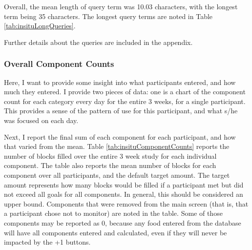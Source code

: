 Overall, the mean length of query term was 10.03 characters, with the longest term being 35 characters. The longest query terms are noted in Table \ref{tab:insituLongQueries}.

Further details about the queries are included in the appendix. 


\subsubsection{Overall Component Counts}
Here, I want to provide some insight into what participants entered, and how much they entered. I provide two pieces of data: one is a chart of the component count for each category every day for the entire 3 weeks, for a single participant. This provides a sense of the pattern of use for this participant, and what s/he was focused on each day. 

Next, I report the final sum of each component for each participant, and how that varied from the mean. Table \ref{tab:insituComponentCounts} reports the number of blocks filled over the entire 3 week study for each individual component. The table also reports the mean number of blocks for each component over all participants, and the default target amount. The target amount represents how many blocks would be filled if a participant met but did not exceed all goals for all components. In general, this should be considered an upper bound. Components that were removed from the main screen (that is, that a participant chose not to monitor) are noted in the table. Some of those components may be reported as 0, because any food entered from the database will have all components entered and calculated, even if they will never be impacted by the +1 buttons. 



